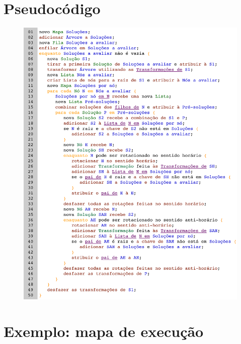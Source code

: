 \documentclass[
	12pt,				%
	openright,			%
	twoside,			%
	a4paper,			%
	english,			%
	french,				%
	spanish,			%
	brazil				%
	]{abntex2}
\begin{document}

% 
\begin{anexosenv}

\partanexos

\chapter{Pseudocódigo}

\begin{figure}[H]
	\begin{center}
	    \includegraphics[scale=0.145]{psc.png}
	\end{center}
\end{figure}

\chapter{Exemplo: mapa de execução}


\end{anexosenv}
\end{document}

